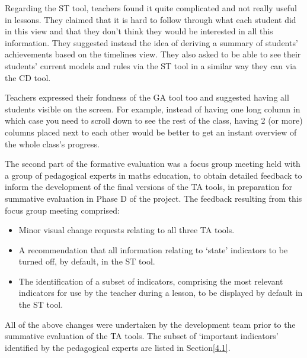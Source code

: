 Regarding the ST tool, teachers found it quite complicated and not
really useful in lessons. They claimed that it is hard to follow
through what each student did in this view and that they don’t think
they would be interested in all this information. They suggested
instead the idea of deriving a summary of students’ achievements based
on the timelines view. They also asked to be able to see their
students’ current models and rules via the ST tool in a similar way
they can via the CD tool.

Teachers expressed their fondness of the GA tool too and suggested
having all students visible on the screen. For example, instead of
having one long column in which case you need to scroll down to see
the rest of the class, having 2 (or more) columns placed next to each
other would be better to get an instant overview of the whole class’s
progress.

The second part of the formative evaluation was a focus group meeting
held with a group of pedagogical experts in maths education, to obtain
detailed feedback to inform the development of the final versions of
the TA tools, in preparation for summative evaluation in Phase D of
the project. The feedback resulting from this focus group meeting
comprised:

\begin{itemize}
\item Minor visual change requests relating to all three TA tools.
\item A recommendation that all information relating to `state’
  indicators to be turned off, by default, in the ST tool. 
\item The identification of a subset of indicators, comprising the
  most relevant indicators for use by the teacher during a lesson, to
  be displayed by default in the ST tool. 
\end{itemize}

All of the above changes were undertaken by the development team prior
to the summative evaluation of the TA tools. The subset of `important
indicators’ identified by the pedagogical experts are listed in
Section\ref{4.1}.




